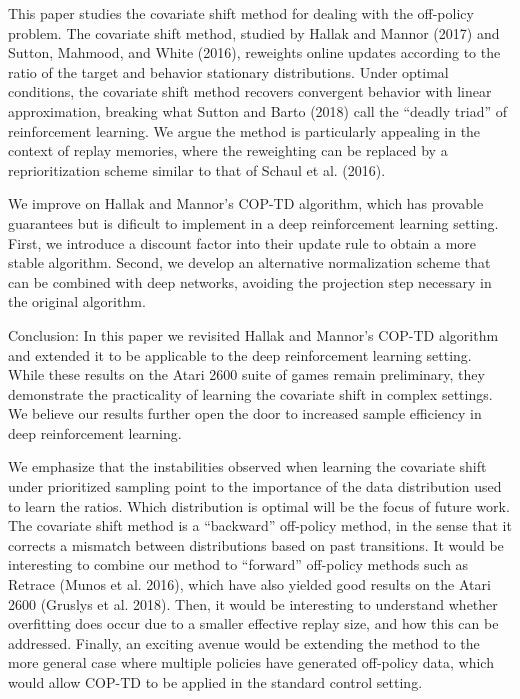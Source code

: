 \documentclass[12pt,a4paper,openright,twoside]{article}
\numberwithin{equation}{section}
\theoremstyle{definition}
\theoremstyle{remark}
\theoremstyle{plain}
\begin{document}
This paper studies the covariate shift method for dealing with the off-policy problem. The covariate shift method, studied by Hallak and Mannor (2017) and Sutton, Mahmood, and White (2016), reweights online updates according to the ratio of the target and behavior stationary distributions. Under optimal conditions, the covariate shift method recovers convergent behavior with linear approximation, breaking what Sutton and Barto (2018) call the “deadly triad” of reinforcement learning. We argue the method is particularly appealing in the context of replay memories, where the reweighting can be replaced by a reprioritization scheme similar to that of Schaul et al. (2016).

We improve on Hallak and Mannor’s COP-TD algorithm, which has provable guarantees but is dificult to implement in a deep reinforcement learning setting. First, we introduce a discount factor into their update rule to obtain a more stable algorithm. Second, we develop an alternative normalization scheme that can be combined with deep networks, avoiding the projection step necessary in the original algorithm.

Conclusion: In this paper we revisited Hallak and Mannor’s COP-TD algorithm and extended it to be applicable to the deep reinforcement learning setting. While these results on the Atari 2600 suite of games remain preliminary, they demonstrate the practicality of learning the covariate shift in complex settings. We believe our results further open the door to increased sample efficiency in deep reinforcement learning.

We emphasize that the instabilities observed when learning the covariate shift under prioritized sampling point to the importance of the data distribution used to learn the ratios. Which distribution is optimal will be the focus of future work. The covariate shift method is a “backward” off-policy method, in the sense that it corrects a mismatch between distributions based on past transitions. It would be interesting to combine our method to “forward” off-policy methods such as Retrace (Munos et al. 2016), which have also yielded good results on the Atari 2600 (Gruslys et al. 2018). Then, it would be interesting to understand whether overfitting does occur due to a smaller effective replay size, and how this can be addressed. Finally, an exciting avenue would be extending the method to the more general case where multiple policies have generated off-policy data, which would allow COP-TD to be applied in the standard control setting.
\end{document}
